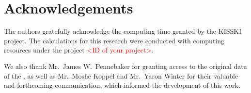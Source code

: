 \section*{Acknowledgements}

The authors gratefully acknowledge the computing time granted by the KISSKI project. 
The calculations for this research were conducted with computing resources under the project \textcolor{red}{<ID of your project>}.

We also thank Mr.~James W.~Pennebaker for granting access to the original data of the \impAppr{}, as well as Mr.~Moshe Koppel and Mr.~Yaron Winter for their valuable and forthcoming communication, which informed the development of this work.